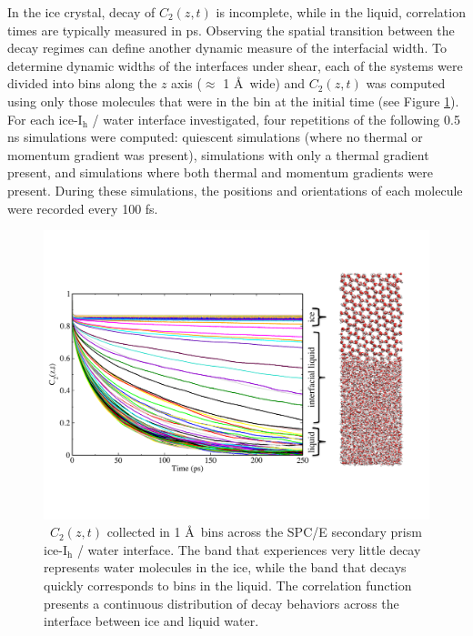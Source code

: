In the ice crystal, decay of $C_2(z,t)$ is incomplete, while in the
liquid, correlation times are typically measured in ps. Observing the
spatial transition between the decay regimes can define another
dynamic measure of the interfacial width. To determine dynamic widths
of the interfaces under shear, each of the systems were divided into
bins along the $z$ axis ($\approx$ 1 \AA\ wide) and $C_2(z,t)$ was
computed using only those molecules that were in the bin at the
initial time (see Figure \ref{fig:Czt}). For each ice-I$_\mathrm{h}$ /
water interface investigated, four repetitions of the following 0.5 ns
simulations were computed: quiescent simulations (where no thermal or
momentum gradient was present), simulations with only a thermal
gradient present, and simulations where both thermal and momentum
gradients were present. During these simulations, the positions and
orientations of each molecule were recorded every 100 fs.

\begin{figure}
\includegraphics[width=\linewidth]{Figures/CztImage}
\caption{\label{fig:Czt}~$C_2(z,t)$ collected in 1 \AA~bins across the SPC/E
  secondary prism ice-I$_\mathrm{h}$ / water interface. The band that experiences very
  little decay represents water molecules in the ice, while the band
  that decays quickly corresponds to bins in the liquid.  The
  correlation function presents a continuous distribution of decay
  behaviors across the interface between ice and liquid water.}
\end{figure}

